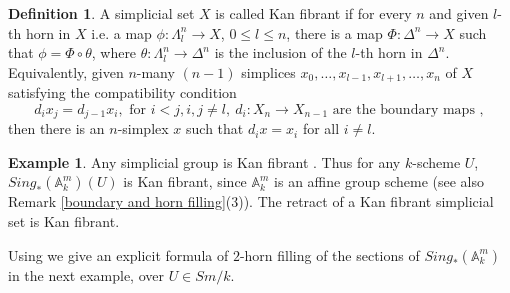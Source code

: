 \documentclass[11pt, reqno]{amsart}
\theoremstyle{plain}
\theoremstyle{definition}
\newtheorem{definition}[thm]{Definition}
\newtheorem{example}[thm]{Example}
\newcommand{\Spec}{{\rm Spec \,}}
\begin{document}
\begin{definition} \label{kan fibrant definition} \cite[Definition 1.3]{may}
A simplicial set $X$ is called Kan fibrant if for every $n$ and 
given $l$-th horn in $X$ i.e. a map $\phi: \Lambda^n_l \to X$, $0 \leq l \leq n$, there is a map $\Phi: \Delta^n \to X$ such that $\phi = \Phi \circ \theta$, where $\theta: \Lambda^n_l \to \Delta^n$ is the inclusion of the $l$-th horn in $\Delta^n$. Equivalently, 
given $n$-many $(n-1)$ simplices $x_0,\dots, x_{l-1}, x_{l+1},\dots, x_n$ of $X$ satisfying the compatibility condition 
$$d_i x_j = d_{j-1} x_i, \text{ for }i < j, i, j \neq l, \ d_i: X_n \to X_{n-1} \text{ are the boundary maps },$$
then there is an $n$-simplex $x$ such that $d_i x  = x_i$ for all $i \neq l$. 
\end{definition}
\begin{example} \label{kan fibrant An}
Any simplicial group is Kan fibrant \cite[Theorem 17.1]{may}. Thus for any $k$-scheme $U$, $Sing_*(\mathbb{A}^m_k)(U)$ is Kan fibrant, since 
$\mathbb{A}^m_k$ is an affine group scheme (see also Remark \ref{boundary and horn filling}(3)). The retract of a Kan fibrant simplicial set is Kan fibrant.
\end{example}
Using \cite[Lemma 3.1]{curtis-simplicial} we give an explicit formula of $2$-horn filling of the sections of $Sing_*(\mathbb{A}^m_k)$ in the next example, over $U \in Sm/k$.





\end{document}
